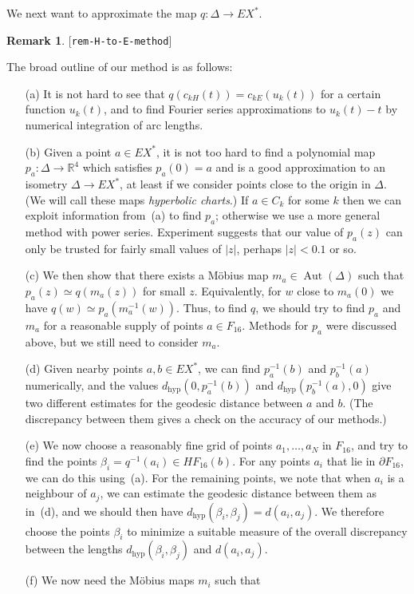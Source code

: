 \documentclass[reqno]{amsart}
\newcommand{\lbl}[1]{\label{#1}\textup{[\texttt{#1}]}\par}
\newcommand{\lbl}{\label}
\newcommand{\Aut}	{\operatorname{Aut}}
\newcommand{\Dl}        {\Delta}
\newcommand{\bt}        {\beta}
\newcommand{\R}         {{\mathbb{R}}}
\newcommand{\dhyp}      {d_{\text{hyp}}}
\renewcommand{\:}{\colon}
\theoremstyle{definition}
\newtheorem{remark}[theorem]{Remark}
\begin{document}
We next want to approximate the map $q\:\Dl\to EX^*$.
\begin{remark}\lbl{rem-H-to-E-method}
 The broad outline of our method is as follows:
 \begin{itemize}
  \item[(a)] It is not hard to see that $q(c_{kH}(t))=c_{kE}(u_k(t))$
   for a certain function $u_k(t)$, and to find Fourier series
   approximations to $u_k(t)-t$ by numerical integration of arc lengths.
  \item[(b)] Given a point $a\in EX^*$, it is not too hard to find a
   polynomial map $p_a\:\Dl\to\R^4$ which satisfies $p_a(0)=a$ and is a
   good approximation to an isometry $\Dl\to EX^*$, at least if we
   consider points close to the origin in $\Dl$.  (We will call these
   maps \emph{hyperbolic charts}.)  If $a\in C_k$ for some $k$ then we
   can exploit information from~(a) to find $p_a$; otherwise we use a
   more general method with power series.  Experiment suggests that
   our value of $p_a(z)$ can only be trusted for fairly small values
   of $|z|$, perhaps $|z|<0.1$ or so.
  \item[(c)] We then show that there exists a M\"obius map
   $m_a\in\Aut(\Dl)$ such that $p_a(z)\simeq q(m_a(z))$ for small $z$.
   Equivalently, for $w$ close to $m_a(0)$ we have
   $q(w)\simeq p_a(m_a^{-1}(w))$.  Thus, to find $q$, we should try to
   find $p_a$ and $m_a$ for a reasonable supply of points
   $a\in F_{16}$.  Methods for $p_a$ were discussed above, but we still
   need to consider $m_a$.
  \item[(d)] Given nearby points $a,b\in EX^*$, we can find
   $p_a^{-1}(b)$ and $p_b^{-1}(a)$ numerically, and the values
   $\dhyp(0,p_a^{-1}(b))$ and $\dhyp(p_b^{-1}(a),0)$ give two different
   estimates for the geodesic distance between $a$ and $b$.  (The
   discrepancy between them gives a check on the accuracy of our
   methods.)
  \item[(e)] We now choose a reasonably fine grid of points
   $a_1,\dotsc,a_N$ in $F_{16}$, and try to find the points
   $\bt_i=q^{-1}(a_i)\in HF_{16}(b)$.  For any points $a_i$ that lie in
   $\partial F_{16}$, we can do this using~(a).  For the remaining
   points, we note that when $a_i$ is a neighbour of $a_j$, we can
   estimate the geodesic distance between them as in~(d), and we should
   then have $\dhyp(\bt_i,\bt_j)=d(a_i,a_j)$.  We therefore choose the
   points $\bt_i$ to minimize a suitable measure of the overall
   discrepancy between the lengths $\dhyp(\bt_i,\bt_j)$ and $d(a_i,a_j)$.
  \item[(f)] We now need the M\"obius maps $m_i$ such that

\end{itemize}
\end{remark}
\end{document}
